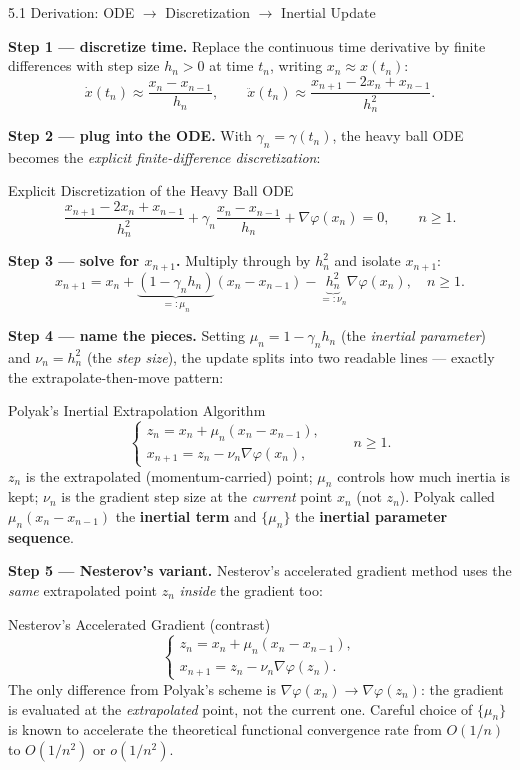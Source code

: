 \documentclass[aspectratio=169,10pt]{beamer}
\begin{document}
\begin{frame}[allowframebreaks]{5.1 Derivation: ODE $\to$ Discretization $\to$ Inertial Update}

  \textbf{Step 1 --- discretize time.}  Replace the continuous
  time derivative by finite differences with step size $h_n>0$ at
  time $t_n$, writing $x_n\approx x(t_n)$:
  \[
    \dot x(t_n)\approx\frac{x_n - x_{n-1}}{h_n},
    \qquad
    \ddot x(t_n)\approx\frac{x_{n+1}-2x_n+x_{n-1}}{h_n^2}.
  \]

  \textbf{Step 2 --- plug into the ODE.}  With
  $\gamma_n=\gamma(t_n)$, the heavy ball ODE becomes the
  \emph{explicit finite-difference discretization}:
  \begin{block}{Explicit Discretization of the Heavy Ball ODE}
    \[
      \frac{x_{n+1}-2x_n+x_{n-1}}{h_n^2}
      + \gamma_n\frac{x_n-x_{n-1}}{h_n}
      + \nabla\varphi(x_n) = 0, \qquad n\ge 1.
    \]
  \end{block}

  \textbf{Step 3 --- solve for $x_{n+1}$.}  Multiply through by
  $h_n^2$ and isolate $x_{n+1}$:
  \[
    x_{n+1} = x_n + \underbrace{(1-\gamma_n h_n)}_{=:\mu_n}(x_n-x_{n-1})
    - \underbrace{h_n^2}_{=:\nu_n}\nabla\varphi(x_n),
    \quad n\ge 1.
  \]

  \framebreak

  \textbf{Step 4 --- name the pieces.}  Setting
  $\mu_n = 1-\gamma_n h_n$ (the \emph{inertial parameter}) and
  $\nu_n=h_n^2$ (the \emph{step size}), the update splits into two
  readable lines --- exactly the extrapolate-then-move pattern:
  \begin{block}{Polyak's Inertial Extrapolation Algorithm}
    \[
      \begin{cases}
        z_n = x_n + \mu_n(x_n - x_{n-1}), \\
        x_{n+1} = z_n - \nu_n\nabla\varphi(x_n),
      \end{cases}
      \qquad n\ge 1.
    \]
    $z_n$ is the extrapolated (momentum-carried) point; $\mu_n$
    controls how much inertia is kept; $\nu_n$ is the gradient
    step size at the \emph{current} point $x_n$ (not $z_n$).
    Polyak called $\mu_n(x_n-x_{n-1})$ the \textbf{inertial term}
    and $\{\mu_n\}$ the \textbf{inertial parameter sequence}.
  \end{block}

  \textbf{Step 5 --- Nesterov's variant.}  Nesterov's accelerated
  gradient method uses the \emph{same} extrapolated point $z_n$
  \emph{inside} the gradient too:
  \begin{block}{Nesterov's Accelerated Gradient (contrast)}
    \[
      \begin{cases}
        z_n = x_n + \mu_n(x_n-x_{n-1}), \\
        x_{n+1} = z_n - \nu_n\nabla\varphi(z_n).
      \end{cases}
    \]
    The only difference from Polyak's scheme is
    $\nabla\varphi(x_n)\to\nabla\varphi(z_n)$: the gradient is
    evaluated at the \emph{extrapolated} point, not the current
    one. Careful choice of $\{\mu_n\}$ is known to accelerate the
    theoretical functional convergence rate from $O(1/n)$ to
    $O(1/n^2)$ or $o(1/n^2)$.
  \end{block}


\end{frame}
\end{document}
